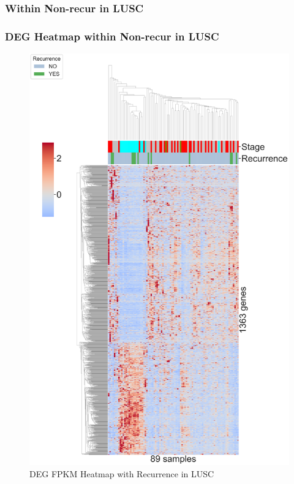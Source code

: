 \documentclass{beamer}
\begin{document}
    \subsubsection{Within Non-recur in LUSC}
    \begin{frame}
        \frametitle{DEG Heatmap within Non-recur in LUSC}

        \begin{figure}
            \includegraphics[width=0.35 \linewidth]{figures/DEG/Cluster/STAR.FPKM.SQC.Recur.pdf}
            \caption{DEG FPKM Heatmap with Recurrence in LUSC}
        \end{figure}
    \end{frame}
\end{document}
